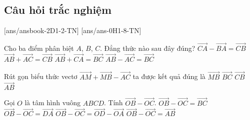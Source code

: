 \subsection{Câu hỏi trắc nghiệm}
[ans/ansbook-2D1-2-TN]
[ans/ans-0H1-8-TN]
\begin{ex}%
	Cho ba điểm phân biệt $A$, $B$, $C$. Đẳng thức nào sau đây đúng?
	\choice
	{\True $\overrightarrow{CA} - \overrightarrow{BA} = \overrightarrow{CB}$}
	{$\overrightarrow{AB} + \overrightarrow{AC} = \overrightarrow{CB}$}
	{$\overrightarrow{AB} + \overrightarrow{CA} = \overrightarrow{BC}$}
	{$\overrightarrow{AB} - \overrightarrow{AC} = \overrightarrow{BC}$}
\end{ex}

\begin{ex}%
	Rút gọn biểu thức vectơ $\vec{AM}+\vec{MB}-\vec{AC}$ ta được kết quả đúng là
	\choice
	{$\vec{MB}$}
	{$\vec{BC}$}
	{\True $\vec{CB}$}
	{$\vec{AB}$}
\end{ex}
\begin{ex}%
	Gọi $O$ là tâm hình vuông $ABCD$. Tính $\overrightarrow{OB}-\overrightarrow{OC}$.
	\choice
	{$\overrightarrow{OB}-\overrightarrow{OC}=\overrightarrow{BC}$}
	{\True $\overrightarrow{OB}-\overrightarrow{OC}=\overrightarrow{DA}$}
	{$\overrightarrow{OB}-\overrightarrow{OC}=\overrightarrow{OD}-\overrightarrow{OA}$}
	{$\overrightarrow{OB}-\overrightarrow{OC}=\overrightarrow{AB}$}
\end{ex}


